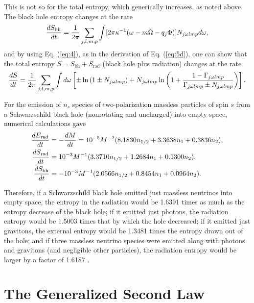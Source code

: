 \documentclass[12pt]{article} \usepackage{latexsym}
\begin{document}
This is not so for the total entropy, which generically increases, as
noted above.  The black hole entropy changes at the rate
 \begin{equation}
 {dS_{\mathrm{bh}}\over dt}
 = {1\over 2\pi}\sum_{j,l,m,p}\int
 [2\pi\kappa^{-1}(\omega-m\Omega-q_j\Phi)] N_{j\omega lmp} d\omega,
 \label{eq:13}
 \end{equation}
and by using Eq. (\ref{eq:4}), as in the derivation of
Eq. (\ref{eq:5d}), one can show that the total entropy
$S=S_{\mathrm{bh}}+S_{\mathrm{rad}}$ (black hole plus radiation) changes
at the rate
 \begin{equation}
 {dS\over dt}
 = {1\over 2\pi}\sum_{j,l,m,p}\int d\omega
 \left[ \pm \ln{(1\pm N_{j\omega lmp})}
   +N_{j\omega lmp}\ln{\left(1+{1-\Gamma_{j\omega lmp} \over \Gamma_{j\omega lmp}
     \pm N_{j\omega lmp}} \right)} \right].
 \label{eq:14}
 \end{equation}

For the emission of $n_s$ species of two-polarization massless
particles of spin $s$ from a Schwarzschild black hole
(nonrotating and uncharged) into empty space, numerical calculations
\cite{Page76,Page76b,Page83} gave
 \begin{align}
 {dE_{\mathrm{rad}}\over dt} &= -{dM\over dt}
 = 10^{-5} M^{-2}(8.1830 n_{1/2} + 3.3638 n_1 + 0.3836 n_2),
 \label{eq:15}\\
 {dS_{\mathrm{rad}}\over dt}
 & = 10^{-3} M^{-1}(3.3710 n_{1/2} + 1.2684 n_1 + 0.1300 n_2),
 \label{eq:16}\\
 {dS_{\mathrm{bh}}\over dt}
 &= - 10^{-3} M^{-1}(2.0566 n_{1/2} + 0.8454 n_1 + 0.0964 n_2).
 \label{eq:17}
 \end{align}

Therefore, if a Schwarzschild black hole emitted just massless
neutrinos into empty space, the entropy in the radiation would be
1.6391 times as much as the entropy decrease of the black hole; if it
emitted just photons, the radiation entropy would be 1.5003 times that
by which the hole decreased; if it emitted just gravitons, the
external entropy would be 1.3481 times the entropy drawn out of the
hole; and if three massless neutrino species were emitted along with
photons and gravitons (and negligible other particles), the radiation
entropy would be larger by a factor of 1.6187 \cite{Page83}.

\section{The Generalized Second Law}
\end{document}
